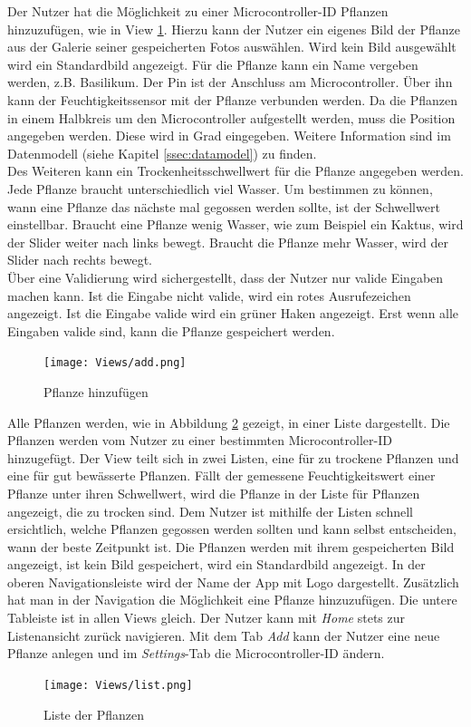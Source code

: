 Der Nutzer hat die Möglichkeit zu einer Microcontroller-ID Pflanzen hinzuzufügen, wie in View \ref{add}. Hierzu kann der Nutzer ein eigenes Bild der Pflanze aus der Galerie seiner gespeicherten Fotos auswählen. Wird kein Bild ausgewählt wird ein Standardbild angezeigt. Für die Pflanze kann ein Name vergeben werden, z.B. Basilikum. Der Pin ist der Anschluss am Microcontroller. Über ihn kann der Feuchtigkeitssensor mit der Pflanze verbunden werden. Da die Pflanzen in einem Halbkreis um den Microcontroller aufgestellt werden, muss die Position angegeben werden. Diese wird in Grad eingegeben. Weitere Information sind im Datenmodell (siehe Kapitel \ref{ssec:datamodel}) zu finden. \\

Des Weiteren kann ein Trockenheitsschwellwert für die Pflanze angegeben werden. Jede Pflanze braucht unterschiedlich viel Wasser. Um bestimmen zu können, wann eine Pflanze das nächste mal gegossen werden sollte, ist der Schwellwert einstellbar. Braucht eine Pflanze wenig Wasser, wie zum Beispiel ein Kaktus, wird der Slider weiter nach links bewegt. Braucht die Pflanze mehr Wasser, wird der Slider nach rechts bewegt. \\

Über eine Validierung wird sichergestellt, dass der Nutzer nur valide Eingaben machen kann. Ist die Eingabe nicht valide, wird ein rotes Ausrufezeichen angezeigt. Ist die Eingabe valide wird ein grüner Haken angezeigt. Erst wenn alle Eingaben valide sind, kann die Pflanze gespeichert werden. 

\begin{figure}[H]
    \centering
    \texttt{[image: Views/add.png]}
    \caption{Pflanze hinzufügen}
    \label{add}
\end{figure}

Alle Pflanzen werden, wie in Abbildung \ref{list} gezeigt,  in einer Liste dargestellt. Die Pflanzen werden vom Nutzer zu einer bestimmten Microcontroller-ID hinzugefügt. Der View teilt sich in zwei Listen, eine für zu trockene Pflanzen und eine für gut bewässerte Pflanzen. Fällt der gemessene Feuchtigkeitswert einer Pflanze unter ihren Schwellwert, wird die Pflanze in der Liste für Pflanzen angezeigt, die zu trocken sind. Dem Nutzer ist mithilfe der Listen schnell ersichtlich, welche Pflanzen gegossen werden sollten und kann selbst entscheiden, wann der beste Zeitpunkt ist. Die Pflanzen werden mit ihrem gespeicherten Bild angezeigt, ist kein Bild gespeichert, wird ein Standardbild angezeigt. In der oberen Navigationsleiste wird der Name der App mit Logo dargestellt. Zusätzlich hat man in der Navigation die Möglichkeit eine Pflanze hinzuzufügen. Die untere Tableiste ist in allen Views gleich. Der Nutzer kann mit \textit{Home} stets zur Listenansicht zurück navigieren. Mit dem Tab \textit{Add} kann der Nutzer eine neue Pflanze anlegen und im \textit{Settings}-Tab die Microcontroller-ID ändern.
\begin{figure}[H]
    \centering
    \texttt{[image: Views/list.png]}
    \caption{Liste der Pflanzen}
    \label{list}
\end{figure}

